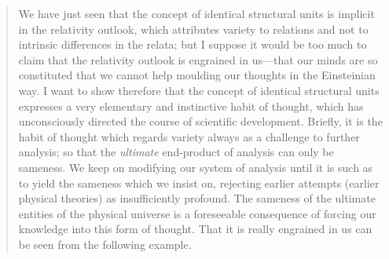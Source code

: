 \begin{quote}
    We have just seen that the concept of identical structural units is implicit in the relativity outlook, which attributes variety to relations and not to intrinsic differences in the relata; but I suppose it would be too much to claim that the relativity outlook is engrained in us---that our minds are so constituted that we cannot help moulding our thoughts in the Einsteinian way.  I want to show therefore that the concept of identical structural units expresses a very elementary and instinctive habit of thought, which has unconsciously directed the course of scientific development.  Briefly, it is the habit of thought which regards variety always as a challenge to further analysis; so that the \emph{ultimate} end-product of analysis can only be sameness.  We keep on modifying our system of analysis until it is such as to yield the sameness which we insist on, rejecting earlier attempts (earlier physical theories) as insufficiently profound.  The sameness of the ultimate entities of the physical universe is a foreseeable consequence of forcing our knowledge into this form of thought.  That it is really engrained in us can be seen from the following example.  


\end{quote}
